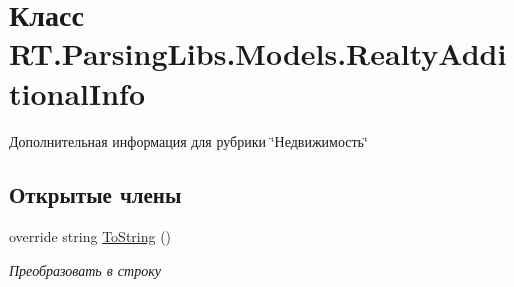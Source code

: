 \hypertarget{class_r_t_1_1_parsing_libs_1_1_models_1_1_realty_additional_info}{\section{Класс R\+T.\+Parsing\+Libs.\+Models.\+Realty\+Additional\+Info}
\label{class_r_t_1_1_parsing_libs_1_1_models_1_1_realty_additional_info}
}


Дополнительная информация для рубрики \char`\"{}Недвижимость\char`\"{}  


\subsection*{Открытые члены}
\begin{DoxyCompactItemize}
\item 
override string \hyperlink{class_r_t_1_1_parsing_libs_1_1_models_1_1_realty_additional_info_ac7f406b43cf8f639cd5f15b148bfed28}{To\+String} ()
\begin{DoxyCompactList}\small\item\em Преобразовать в строку \end{DoxyCompactList}\end{DoxyCompactItemize}
